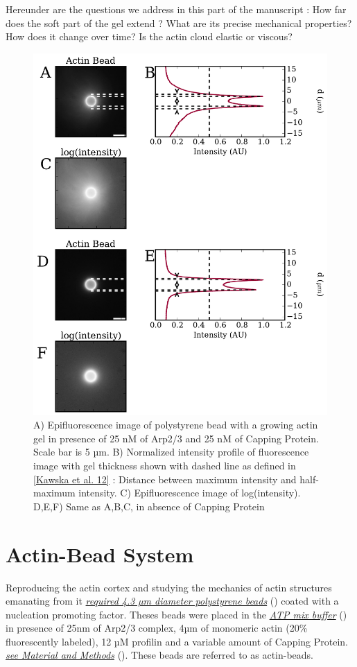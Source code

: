 \documentclass[A4paperpaper,11pt,english]{sphinxmanual}
\begin{document}
Hereunder are the questions we address in this part of the manuscript :
How far does the soft part of the gel extend ? What are its precise mechanical properties?  How does it change
over time?  Is the actin cloud elastic or viscous?
\begin{figure}[htbp]
\centering
\capstart

\includegraphics[width=0.800\linewidth]{intensity_profile_xnM_Arp_xnM_CP_xmin.pdf}
\caption{A) Epifluorescence image of polystyrene bead with a growing actin gel in
presence of 25 nM of Arp2/3 and 25 nM of Capping Protein. Scale bar is 5
µm.  B) Normalized intensity profile of fluorescence image with gel thickness
shown with dashed line as defined in {\hyperref[index-latex:kawska2012]{{[}Kawska et al. 12{]}}} :
Distance between maximum intensity and half-maximum intensity.  C)
Epifluorescence image of log(intensity). D,E,F) Same as A,B,C, in absence
of Capping Protein}\label{index-latex:fig-intensity-profile}\end{figure}


\section{Actin-Bead System}
\label{index-latex:actin-bead-system}
Reproducing the actin cortex and studying the mechanics of actin structures
emanating from it {\hyperref[index-latex:bead-preparation]{\emph{required 4.3 µm diameter polystyrene beads}}} ()
coated with a nucleation promoting factor. Theses beads were placed
in the {\hyperref[index-latex:atp-mix-buffer]{\emph{ATP mix buffer}}} () in presence of 25nm of Arp2/3
complex, 4µm of monomeric actin (20\% fluorescently labeled), 12 µM profilin and
a variable amount of Capping Protein. {\hyperref[index-latex:m-et-m]{\emph{see Material and Methods}}} ().
These beads are referred to as actin-beads.
\end{document}

